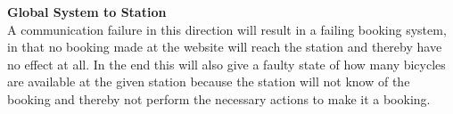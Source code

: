 \textbf{Global System to Station}\\
A communication failure in this direction will result in a failing booking system, in that no booking made at the website will reach the station and thereby have no effect at all.
In the end this will also give a faulty state of how many bicycles are available at the given station because the station will not know of the booking and thereby not perform the necessary actions to make it a booking.

